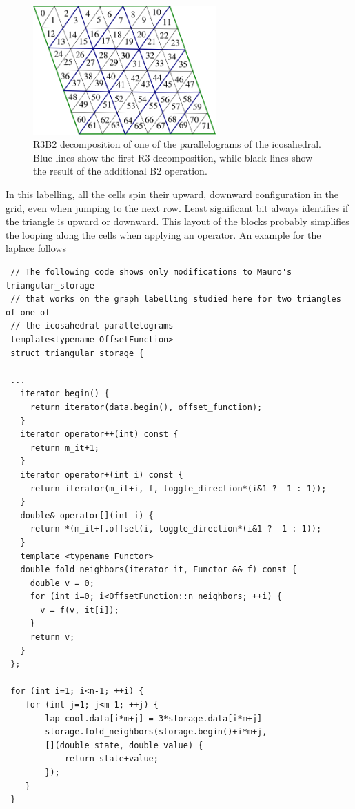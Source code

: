 \documentclass{book}
\begin{document}
\begin{figure}[htb!]
	\begin{center}
		\includegraphics[width=7cm]{IcosahedralGridCells.png}
	\caption{R3B2 decomposition of one of the parallelograms of the icosahedral. Blue lines show the first R3 decomposition, while black lines show the result of the additional B2 operation.}
	\label{fig:IcosahedralCells}
	\end{center}
\end{figure}

In this labelling, all the cells spin their upward, downward configuration in the grid, even when jumping to the next row. 
Least significant bit always identifies if the triangle is upward or downward.  
This layout of the blocks probably simplifies the looping along the cells when applying an operator. An example for the laplace follows
\begin{verbatim}
 // The following code shows only modifications to Mauro's triangular_storage
 // that works on the graph labelling studied here for two triangles of one of 
 // the icosahedral parallelograms
 template<typename OffsetFunction>
 struct triangular_storage {
 
 ...
   iterator begin() {
     return iterator(data.begin(), offset_function);
   }
   iterator operator++(int) const {
     return m_it+1;
   }
   iterator operator+(int i) const {
     return iterator(m_it+i, f, toggle_direction*(i&1 ? -1 : 1));
   }
   double& operator[](int i) {
     return *(m_it+f.offset(i, toggle_direction*(i&1 ? -1 : 1));
   }
   template <typename Functor>
   double fold_neighbors(iterator it, Functor && f) const {
     double v = 0;
     for (int i=0; i<OffsetFunction::n_neighbors; ++i) {
       v = f(v, it[i]);
     }
     return v;
   }
 };
 
 for (int i=1; i<n-1; ++i) {
 	for (int j=1; j<m-1; ++j) {
 		lap_cool.data[i*m+j] = 3*storage.data[i*m+j] -
 		storage.fold_neighbors(storage.begin()+i*m+j,
 		[](double state, double value) {
 			return state+value;
 		});
 	}
 }
\end{verbatim}
\end{document}
